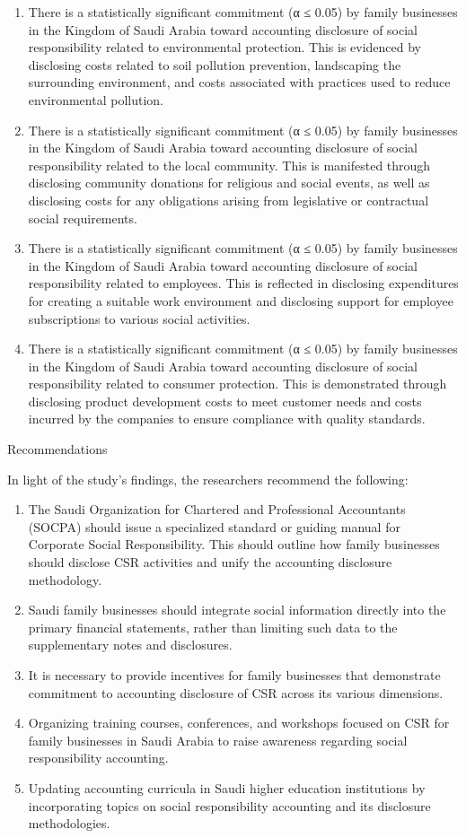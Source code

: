 \documentclass[10pt]{NSP1}
\begin{document}
\begin{enumerate}
  \item There is a statistically significant commitment (α ≤ 0.05) by family businesses in the Kingdom of Saudi Arabia toward accounting disclosure of social responsibility related to environmental protection. This is evidenced by disclosing costs related to soil pollution prevention, landscaping the surrounding environment, and costs associated with practices used to reduce environmental pollution.
  \item There is a statistically significant commitment (α ≤ 0.05) by family businesses in the Kingdom of Saudi Arabia toward accounting disclosure of social responsibility related to the local community. This is manifested through disclosing community donations for religious and social events, as well as disclosing costs for any obligations arising from legislative or contractual social requirements.
  \item There is a statistically significant commitment (α ≤ 0.05) by family businesses in the Kingdom of Saudi Arabia toward accounting disclosure of social responsibility related to employees. This is reflected in disclosing expenditures for creating a suitable work environment and disclosing support for employee subscriptions to various social activities.
  \item There is a statistically significant commitment (α ≤ 0.05) by family businesses in the Kingdom of Saudi Arabia toward accounting disclosure of social responsibility related to consumer protection. This is demonstrated through disclosing product development costs to meet customer needs and costs incurred by the companies to ensure compliance with quality standards.
\end{enumerate}

Recommendations

In light of the study’s findings, the researchers recommend the following:

\begin{enumerate}
  \item The Saudi Organization for Chartered and Professional Accountants (SOCPA) should issue a specialized standard or guiding manual for Corporate Social Responsibility. This should outline how family businesses should disclose CSR activities and unify the accounting disclosure methodology.
  \item Saudi family businesses should integrate social information directly into the primary financial statements, rather than limiting such data to the supplementary notes and disclosures.
  \item It is necessary to provide incentives for family businesses that demonstrate commitment to accounting disclosure of CSR across its various dimensions.
  \item Organizing training courses, conferences, and workshops focused on CSR for family businesses in Saudi Arabia to raise awareness regarding social responsibility accounting.
  \item Updating accounting curricula in Saudi higher education institutions by incorporating topics on social responsibility accounting and its disclosure methodologies.
\end{enumerate}
\end{document}
